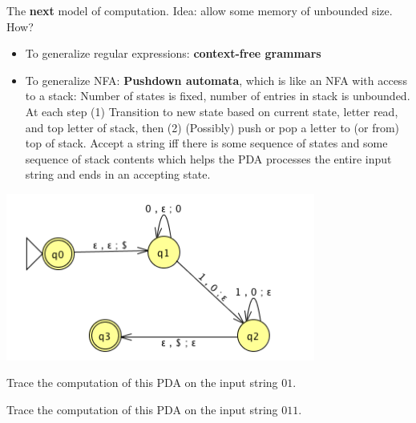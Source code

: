 The {\bf next} model of computation. Idea: allow some memory of unbounded size. How? 
\begin{itemize}
    \item To generalize regular expressions: {\bf context-free grammars}\\
    \item To generalize NFA: {\bf Pushdown automata}, which is like an NFA with access to a stack: 
    Number of states is fixed, number of entries in stack is unbounded. At each step
    (1) Transition to new state based on current state, letter read, and top letter of stack, then
    (2) (Possibly) push or pop a letter to (or from) top of stack. Accept a string iff
    there is some sequence of states and some sequence of stack contents 
    which helps the PDA processes the entire input string and ends in an accepting state.
\end{itemize}

\includegraphics[width=4in]{../../resources/machines/Lect9PDA.png}
    
Trace the computation of this PDA on the input string $01$.

\vspace{80pt}  
    
Trace the computation of this PDA on the input string $011$.

\vspace{80pt}
